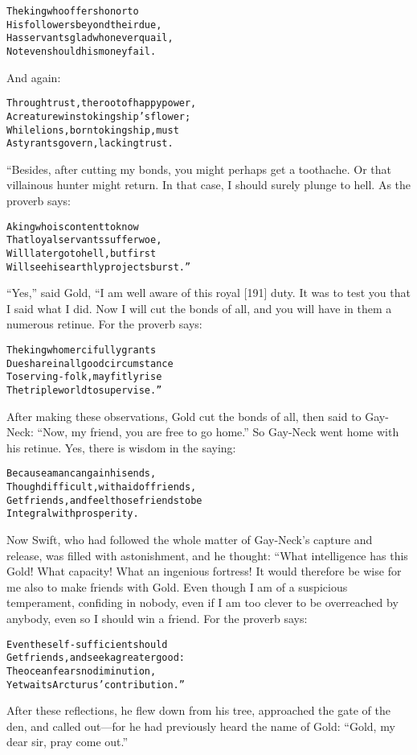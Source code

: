 \documentclass{article}
\renewenvironment{verbatim}{\begin{alltt}\normalfont\begin{centering}}{\end{centering}\end{alltt}}
\begin{document}
\begin{verbatim}
The king who offers honor to
His followers beyond their due,
Has servants glad who never quail,
Not even should his money fail.
\end{verbatim}
And again:

\begin{verbatim}
Through trust, the root of happy power,
A creature wins to kingship's flower;
While lions, born to kingship, must
As tyrants govern, lacking trust.
\end{verbatim}
“Besides, after cutting my bonds, you might perhaps get a
toothache. Or that villainous hunter might return. In that case, I
should surely plunge to hell. As the proverb says:

\begin{verbatim}
A king who is content to know
That loyal servants suffer woe,
Will later go to hell, but first
Will see his earthly projects burst.”
\end{verbatim}
``Yes,'' said Gold, “I am well aware of this royal [191] duty. It
was to test you that I said what I did. Now I will cut the bonds of
all, and you will have in them a numerous retinue. For the proverb
says:

\begin{verbatim}
The king who mercifully grants
Due share in all good circumstance
To serving-folk, may fitly rise
The triple world to supervise.”
\end{verbatim}
After making these observations, Gold cut the bonds of all, then
said to Gay-Neck: ``Now, my friend, you are free to go home.'' So
Gay-Neck went home with his retinue. Yes, there is wisdom in the
saying:

\begin{verbatim}
Because a man can gain his ends,
Though difficult, with aid of friends,
Get friends, and feel those friends to be
Integral with prosperity.
\end{verbatim}
Now Swift, who had followed the whole matter of Gay-Neck's capture
and release, was filled with astonishment, and he thought: “What
intelligence has this Gold! What capacity! What an ingenious
fortress! It would therefore be wise for me also to make friends
with Gold. Even though I am of a suspicious temperament, confiding
in nobody, even if I am too clever to be overreached by anybody,
even so I should win a friend. For the proverb says:

\begin{verbatim}
Even the self-sufficient should
Get friends, and seek a greater good:
The ocean fears no diminution,
Yet waits Arcturus' contribution.”
\end{verbatim}
After these reflections, he flew down from his tree, approached the
gate of the den, and called out---for he had previously heard the
name of Gold: ``Gold, my dear sir, pray come out.''
\end{document}

